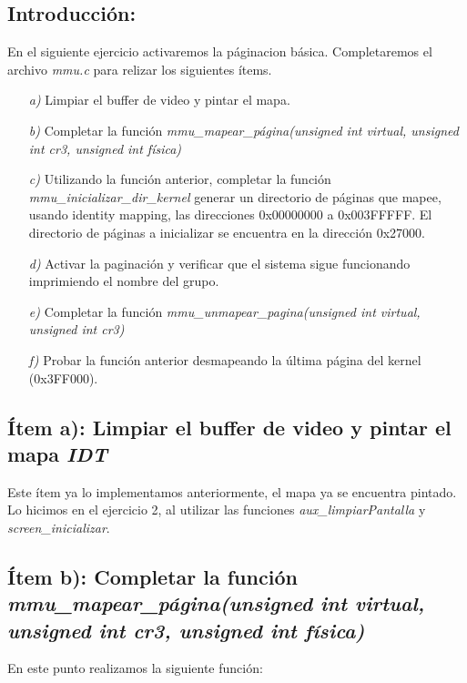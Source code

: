 \subsection{Introducción:}

En el siguiente ejercicio activaremos la páginacion básica. Completaremos el archivo \textit{mmu.c} para relizar los siguientes ítems.
\begin{itemize}
\item [\textit{a)}] Limpiar el buffer de video y pintar el mapa.
\item [\textit{b)}] Completar la función \textit{mmu\_mapear\_página(unsigned int virtual, unsigned int cr3, unsigned int física)}
\item [\textit{c)}] Utilizando la función anterior, completar la función \textit{mmu\_inicializar\_dir\_kernel} generar un directorio de páginas que mapee, usando identity mapping, las direcciones 0x00000000 a 0x003FFFFF. El directorio de páginas a inicializar se encuentra en la dirección 0x27000.
\item [\textit{d)}] Activar la paginación y verificar que el sistema sigue funcionando imprimiendo el nombre del grupo.
\item [\textit{e)}] Completar la función \textit{mmu\_unmapear\_pagina(unsigned int virtual, unsigned int cr3)}
\item [\textit{f)}] Probar la función anterior desmapeando la última página del kernel (0x3FF000).
\end{itemize}

\subsection{Ítem a): Limpiar el buffer de video y pintar el mapa \textit{IDT}}

Este ítem ya lo implementamos anteriormente, el mapa ya se encuentra pintado. Lo hicimos en el ejercicio 2, al utilizar las funciones  \textit{aux\_limpiarPantalla} y \textit{screen\_inicializar}. \\

\subsection{Ítem b): Completar la función \textit{mmu\_mapear\_página(unsigned int virtual, unsigned int cr3, unsigned int física)}}

En este punto realizamos la siguiente función: 

